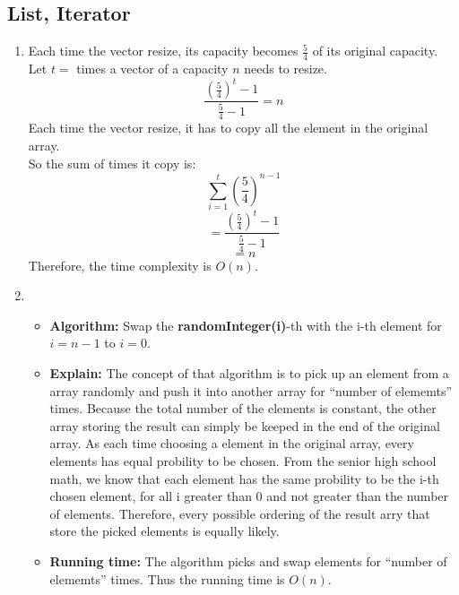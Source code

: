 \documentclass[fleqn,a4paper,12pt]{article}
\begin{document}
\subsection{List, Iterator}
\begin{enumerate}
\item
  Each time the vector resize, its capacity becomes $\frac {5}{4}$ of its original capacity.\\
  Let $t=$ times a vector of a capacity $n$ needs to resize.\\
  \[ \frac {(\frac {5}{4})^t-1}{\frac {5}{4}-1} = n\]
  Each time the vector resize, it has to copy all the element in the original array.\\
  So the sum of times it copy is:\\
  \[ \sum_{i=1}^{t}(\frac {5}{4})^{n-1} \]
  \[ = \frac {(\frac{5}{4})^t - 1}{\frac{5}{4} - 1}\]
  \[ = n \]
  Therefore, the time complexity is $O(n)$.

\item
  \begin{itemize}
  \item
    \textbf{Algorithm: }Swap the \textbf{randomInteger(i)}-th with the i-th element for $i=n-1$ to $i=0$.
  \item
    \textbf{Explain: }The concept of that algorithm is to pick up an element from a array randomly and push it into another array for ``number of elememts'' times. Because the total number of the elements is constant, the other array storing the result can simply be keeped in the end of the original array. As each time choosing a element in the original array, every elements has equal probility to be chosen. From the senior high school math, we know that each element has the same probility to be the i-th chosen element, for all i greater than 0 and not greater than the number of elements. Therefore, every possible ordering of the result arry that store the picked elements is equally likely. 
  \item
    \textbf{Running time: }The algorithm picks and swap elements for ``number of elememts'' times. Thus the running time is $O(n)$.
  \end{itemize}
  \end{enumerate}
\end{document}
